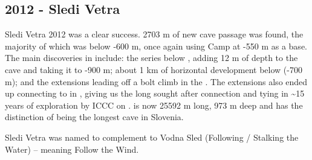 \begin{tcolorbox}
\chapter{2012 - Sledi Vetra}

Sledi Vetra 2012 was a clear success. 2703 m of new cave passage was
found, the majority of which was below -600 m, once again using Camp
 at -550 m as a base. The main discoveries in
 include: the  series below
, adding 12 m of depth to the cave and taking it to -900 m;
about 1 km of horizontal development below 
(-700 m); and the  extensions leading off a bolt climb in
the . The  extensions also ended
up connecting to  in , giving us the long
sought after connection and tying in \textasciitilde 15 years of
exploration by ICCC on .  is now 25592 m long, 973
m deep and has the distinction of being the longest cave in Slovenia.

Sledi Vetra was named to complement to Vodna Sled (Following / Stalking the Water) -- meaning Follow the Wind.


\end{tcolorbox}
\BgThispage

